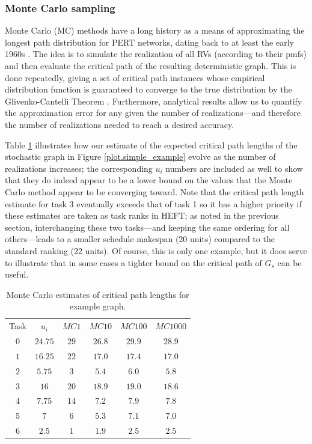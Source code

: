 \documentclass[12pt]{article}
\begin{document}
\subsubsection{Monte Carlo sampling}
\label{subsubsect.monte_carlo}

Monte Carlo (MC) methods have a long history as a means of approximating the longest path distribution for PERT networks, dating back to at least the early 1960s \cite{van1963letter}. The idea is to simulate the realization of all RVs (according to their pmfs) and then evaluate the critical path of the resulting deterministic graph. This is done repeatedly, giving a set of critical path instances whose empirical distribution function is guaranteed to converge to the true distribution by the Glivenko-Cantelli Theorem \cite{canon2016correlation}. Furthermore, analytical results allow us to quantify the approximation error for any given the number of realizations---and therefore the number of realizations needed to reach a desired accuracy.  

Table \ref{tb.mc_example} illustrates how our estimate of the expected critical path lengths of the stochastic graph in Figure \ref{plot.simple_example} evolve as the number of realizations increases; the corresponding $u_i$ numbers are included as well to show that they do indeed appear to be a lower bound on the values that the Monte Carlo method appear to be converging toward. Note that the critical path length estimate for task 3 eventually exceeds that of task 1 so it has a higher priority if these estimates are taken as task ranks in HEFT; as noted in the previous section, interchanging these two tasks---and keeping the same ordering for all others---leads to a smaller schedule makespan (20 units) compared to the standard ranking (22 units). Of course, this is only one example, but it does serve to illustrate that in some cases a tighter bound on the critical path of $G_s$ can be useful.  

\begin{table}
	\caption{Monte Carlo estimates of critical path lengths for example graph.} 
	\begin{center}	
		\begin{tabular}{c c c c c c}
			\cmidrule{1-6}
			Task & $u_i$ & $MC1$ & $MC10$ & $MC100$ & $MC1000$\\
			\cmidrule{1-6}
			$0$ & $24.75$ & $29$ & $26.8$ & $29.9$ & $28.9$\\
			$1$ & $16.25$ & $22$ & $17.0$ & $17.4$ & $17.0$\\
			$2$ & $5.75$ & $3$ & $5.4$ & $6.0$ & $5.8$\\
			$3$ & $16$ & $20$ & $18.9$ & $19.0$ & $18.6$\\
			$4$ & $7.75$ & $14$ & $7.2$ & $7.9$ & $7.8$\\
			$5$ & $7$ & $6$ & $5.3$ & $7.1$ & $7.0$\\
			$6$ & $2.5$ & $1$ & $1.9$ & $2.5$ & $2.5$\\
			\bottomrule
		\end{tabular}
		\label{tb.mc_example}
	\end{center}	
\end{table} 
\end{document}
